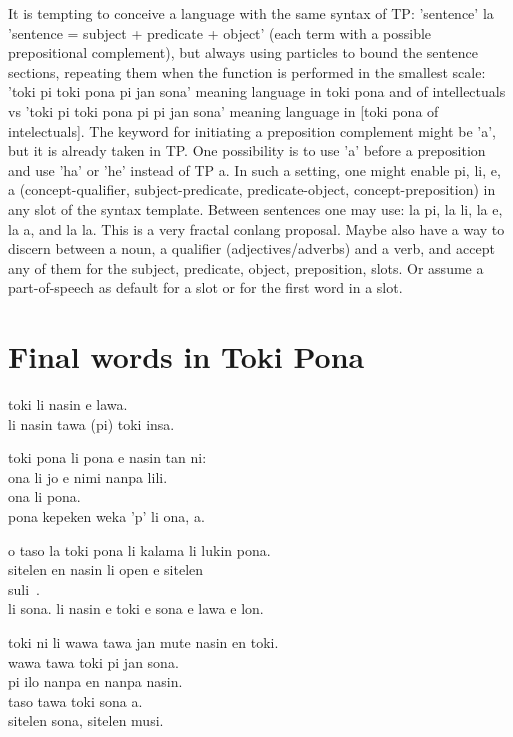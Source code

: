 It is tempting to conceive a language with the same syntax of TP:
'sentence' la 'sentence = subject + predicate + object' (each term with
a possible prepositional complement),
but always using particles to bound the sentence sections,
repeating them when the function is performed in the smallest scale:
'toki pi toki pona pi jan sona' meaning
language in toki pona and of intellectuals vs
'toki pi toki pona pi pi jan sona'
meaning language in [toki pona of intelectuals].
The keyword for initiating a preposition complement 
might be 'a', but it is already taken in TP.
One possibility is to use 'a' before a preposition and use 'ha' or 'he'
instead of TP a.
In such a setting,
one might enable pi, li, e, a (concept-qualifier, subject-predicate,
predicate-object, concept-preposition)
in any slot of the syntax template.
Between sentences one may use:
la pi, la li, la e, la a, and la la.
This is a very fractal conlang proposal.
Maybe also have a way to discern between a noun,
a qualifier (adjectives/adverbs) and a verb,
and accept any of them for the subject, predicate, object, preposition,
slots. Or assume a part-of-speech as default for a slot or for the
first word in a slot.

\section{Final words in Toki Pona}\label{ftp}
toki li nasin e lawa.\\
li nasin tawa (pi) toki insa.

toki pona li pona e nasin tan ni:\\
ona li jo e nimi nanpa lili.\\
ona li pona.\\
pona kepeken weka 'p' li ona, a.

o taso la toki pona li kalama li lukin pona.\\
sitelen en nasin li open e sitelen\\
suli~\cite{tpLang,kama,akesiWawa,gdoc,tokisona,Wikipesija}.\\
li sona. li nasin e toki e sona e lawa e lon.

toki ni li wawa tawa jan mute nasin en toki.\\
wawa tawa toki pi jan sona.\\
pi ilo nanpa en nanpa nasin.\\
taso tawa toki sona a.\\
sitelen sona, sitelen musi.

